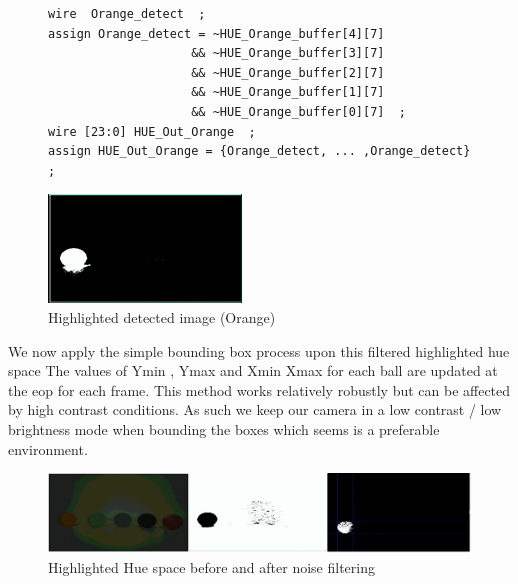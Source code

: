\documentclass[10pt,twoside]{article}
\begin{document}
\begin{figure}[hbt]
\begin{minipage}{.49\textwidth}
\begin{verbatim}
wire  Orange_detect  ; 
assign Orange_detect = ~HUE_Orange_buffer[4][7] 
                    && ~HUE_Orange_buffer[3][7] 
                    && ~HUE_Orange_buffer[2][7] 
                    && ~HUE_Orange_buffer[1][7] 
                    && ~HUE_Orange_buffer[0][7]  ; 
wire [23:0] HUE_Out_Orange  ;
assign HUE_Out_Orange = {Orange_detect, ... ,Orange_detect} ; 

\end{verbatim}
\end{minipage}
\begin{minipage}{.49\textwidth}
            \includegraphics[scale = .99]{Detect.PNG}
            \centering
            \caption{Highlighted detected image (Orange)}
            \label{fig:InitalDesign}
\end{minipage}
\end{figure}

We now apply the simple bounding box process upon this filtered highlighted hue space The values of Ymin , Ymax and Xmin Xmax for each ball are updated at the eop for each frame. This method works relatively robustly but can be affected by high contrast conditions. As such we keep our camera in a low contrast / low brightness mode when bounding the boxes which seems is a preferable environment. 

\begin{figure}[hbt]
    \centering
    \includegraphics[scale = 0.35]{AnalysisImag.PNG}
    \caption{Highlighted Hue space before and after noise filtering}
    \label{fig:HightedHueSpace}
\end{figure}



\newpage
\end{document}
